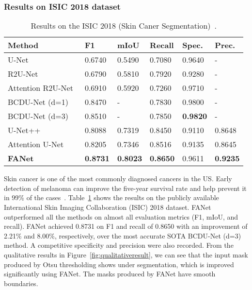 \documentclass[journal]{IEEEtran}
\begin{document}
\subsubsection{Results on ISIC 2018 dataset}
\begin{table}[!t]
\footnotesize
\centering
\caption{Results on the ISIC 2018 (Skin Caner Segmentation)~\cite{codella2018skin,tschandl2018ham10000}.}
\begin{tabular}{@{}l|l|l|l|l|l@{}}
\toprule
\textbf{Method} & \textbf{F1} & \textbf{mIoU }& \textbf{Recall}& \textbf{Spec.} & \textbf{Prec.} \\ 
\midrule
U-Net~\cite{ronneberger2015u} & 0.6740  & 0.5490 & 0.7080 & 0.9640 & -    \\ R2U-Net~\cite{alom2018recurrent} & 0.6790  & 0.5810 & 0.7920 & 0.9280 & -    \\ Attention R2U-Net~\cite{alom2018recurrent} &  0.6910  & 0.5920 & 0.7260 & 0.9710 & -    \\ BCDU-Net (d=1)~\cite{azad2019bi} & 0.8470  & - & 0.7830 & 0.9800 & -    \\ BCDU-Net (d=3)~\cite{azad2019bi} & 0.8510  & -  & 0.7850 & \textbf{0.9820} & -       \\ U-Net++~\cite{zhou2018unet++} &0.8088 &0.7319 &0.8450 &0.9110 &0.8648 \\ Attention U-Net~\cite{oktay2018attention} & 0.8205 &0.7346 &0.8516 &0.9135 &0.8645  \\ \textbf{FANet} & \textbf{0.8731} & \textbf{0.8023} & \textbf{0.8650} & 0.9611 & \textbf{0.9235} \\ \bottomrule
\end{tabular}
\label{tab:ISIC2018}
\end{table}

Skin cancer is one of the most commonly diagnosed cancers in the US. Early detection of melanoma can improve the five-year survival rate and help prevent it in 99\% of the cases~\cite{cancerfigures}. Table~\ref{tab:ISIC2018} shows the results on the publicly available International Skin Imaging Collaboration (ISIC) 2018 dataset. FANet outperformed all the methods on almost all evaluation metrics (F1, mIoU, and recall). FANet achieved 0.8731 on F1 and recall of 0.8650 with an improvement of 2.21\% and 8.00\%, respectively, over the most accurate \ac{SOTA} BCDU-Net (d=3) method. A competitive specificity and precision were also recorded. From the qualitative results in Figure~\ref{fig:qualitativeresult}, we can see that the input mask produced by Otsu thresholding shows under segmentation, which is improved significantly using FANet. The masks produced by FANet have smooth boundaries. 
\end{document}
